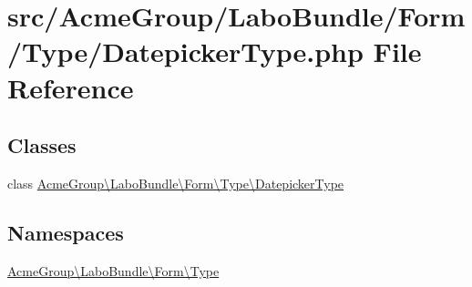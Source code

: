 \hypertarget{_datepicker_type_8php}{\section{src/\+Acme\+Group/\+Labo\+Bundle/\+Form/\+Type/\+Datepicker\+Type.php File Reference}
\label{_datepicker_type_8php}
}
\subsection*{Classes}
\begin{DoxyCompactItemize}
\item 
class \hyperlink{class_acme_group_1_1_labo_bundle_1_1_form_1_1_type_1_1_datepicker_type}{Acme\+Group\textbackslash{}\+Labo\+Bundle\textbackslash{}\+Form\textbackslash{}\+Type\textbackslash{}\+Datepicker\+Type}
\end{DoxyCompactItemize}
\subsection*{Namespaces}
\begin{DoxyCompactItemize}
\item 
 \hyperlink{namespace_acme_group_1_1_labo_bundle_1_1_form_1_1_type}{Acme\+Group\textbackslash{}\+Labo\+Bundle\textbackslash{}\+Form\textbackslash{}\+Type}
\end{DoxyCompactItemize}

